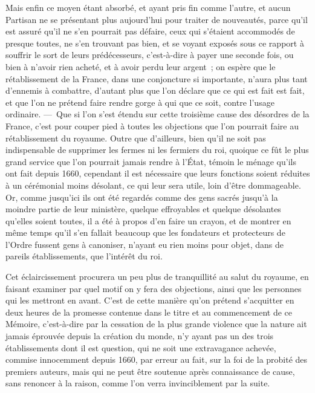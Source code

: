 \documentclass[french,twoside]{book} %
\begin{document}
Mais enfin ce moyen étant absorbé, et ayant pris fin comme l’autre, et aucun Partisan ne se présentant plus aujourd’hui pour traiter de nouveautés, parce qu’il est assuré qu’il ne s’en pourrait pas défaire, ceux qui s’étaient accommodés de presque toutes, ne s’en trouvant pas bien, et se voyant exposés sous ce rapport à souffrir le sort de leurs prédécesseurs, c’est-à-dire à payer une seconde fois, ou bien à n’avoir rien acheté, et à avoir perdu leur argent ; on espère que le rétablissement de la France, dans une conjoncture si importante, n’aura plus tant d’ennemis à combattre, d’autant plus que l’on déclare que ce qui est fait est fait, et que l’on ne prétend faire rendre gorge à qui que ce soit, contre l’usage ordinaire. — Que si l’on s’est étendu sur cette troisième cause des désordres de la France, c’est pour couper pied à toutes les objections que l’on pourrait faire au rétablissement du royaume. Outre que d’ailleurs, bien qu’il ne soit pas indispensable de supprimer les fermes ni les fermiers du roi, quoique ce fût le plus grand service que l’on pourrait jamais rendre à l’État, témoin le ménage qu’ils ont fait depuis 1660, cependant il est nécessaire que leurs fonctions soient réduites à un cérémonial moins désolant, ce qui leur sera utile, loin d’être dommageable. Or, comme jusqu’ici ils ont été regardés comme des gens sacrés jusqu’à la moindre partie de leur ministère, quelque effroyables et quelque désolantes qu’elles soient toutes, il a été à propos d’en faire un crayon, et de montrer en même temps qu’il s’en fallait beaucoup que les fondateurs et protecteurs de l’Ordre fussent gens à canoniser, n’ayant eu rien moins pour objet, dans de pareils établissements, que l’intérêt du roi.\par
Cet éclaircissement procurera un peu plus de tranquillité au salut du royaume, en faisant examiner par quel motif on y fera des objections, ainsi que les personnes qui les mettront en avant. C’est de cette manière qu’on prétend s’acquitter en deux heures de la promesse contenue dans le titre et au commencement de ce Mémoire, c’est-à-dire par la cessation de la plus grande violence que la nature ait jamais éprouvée depuis la création du monde, n’y ayant pas un des trois établissements dont il est question, qui ne soit une extravagance achevée, commise innocemment depuis 1660, par erreur au fait, sur la foi de la probité des premiers auteurs, mais qui ne peut être soutenue après connaissance de cause, sans renoncer à la raison, comme l’on verra invinciblement par la suite.
\end{document}
